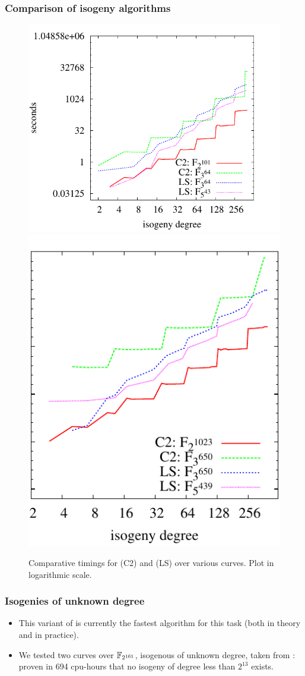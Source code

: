 \documentclass[10pt,usepdftitle=false]{beamer}
\begin{document}
\begin{frame}
  \frametitle{Comparison of isogeny algorithms}
  
  \begin{figure}
    \centering
    \includegraphics[height=0.5\textwidth]{../isogeny/C2-LS}
    \includegraphics[height=0.5\textwidth]{../isogeny/C2-LS2}
    \caption{Comparative timings for \cite{couveignes96} (C2) and
      \cite{lercier+sirvent08} (LS) over various curves. Plot in
      logarithmic scale.}
  \label{fig:comp}
\end{figure}
\end{frame}

\begin{frame}
  \frametitle{Isogenies of unknown degree}
  \large

  \begin{itemize}
  \item This variant of \cite{couveignes96} is currently the fastest
    algorithm for this task (both in theory and in practice).
  \item We tested two curves over $\mathbb{F}_{2^{161}}$, isogenous of
    unknown degree, taken from \cite{teske06}: proven in 694
    cpu-hours that no isogeny of degree less than $2^{13}$ exists.
  \end{itemize}
\end{frame}
\end{document}
